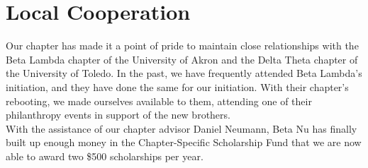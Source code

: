   \section*{Local Cooperation}
    Our chapter has made it a point of pride to maintain close relationships with the Beta Lambda chapter of the University of Akron and the Delta Theta chapter of the University of Toledo. In the past, we have frequently attended Beta Lambda's initiation, and they have done the same for our initiation. With their chapter's rebooting, we made ourselves available to them, attending one of their philanthropy events in support of the new brothers. \\
    
    With the assistance of our chapter advisor Daniel Neumann, Beta Nu has finally built up enough money in the Chapter-Specific Scholarship Fund that we are now able to award two \$500 scholarships per year.

 